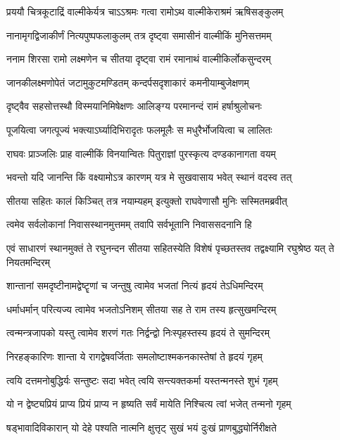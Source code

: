 \twolineshloka
{प्रययौ चित्रकूटाद्रिं वाल्मीकेर्यत्र चाऽऽश्रमः}
{गत्वा रामोऽथ वाल्मीकेराश्रमं ऋषिसङ्कुलम्} %

\twolineshloka
{नानामृगद्विजाकीर्णं नित्यपुष्पफलाकुलम्}
{तत्र दृष्ट्वा समासीनं वाल्मीकिं मुनिसत्तमम्} %

\twolineshloka
{ननाम शिरसा रामो लक्ष्मणेन च सीतया}
{दृष्ट्वा रामं रमानाथं वाल्मीकिर्लोकसुन्दरम्} %

\twolineshloka
{जानकीलक्ष्मणोपेतं जटामुकुटमण्डितम्}
{कन्दर्पसदृशाकारं कमनीयाम्बुजेक्षणम्} %

\twolineshloka
{दृष्ट्वैव सहसोत्तस्थौ विस्मयानिमिषेक्षणः}
{आलिङ्ग्य परमानन्दं रामं हर्षाश्रुलोचनः} %

\twolineshloka
{पूजयित्वा जगत्पूज्यं भक्त्याऽर्घ्यादिभिरादृतः}
{फलमूलैः स मधुरैर्भोजयित्वा च लालितः} %

\twolineshloka
{राघवः प्राञ्जलिः प्राह वाल्मीकिं विनयान्वितः}
{पितुराज्ञां पुरस्कृत्य दण्डकानागता वयम्} %

\twolineshloka
{भवन्तो यदि जानन्ति किं वक्ष्यामोऽत्र कारणम्}
{यत्र मे सुखवासाय भवेत् स्थानं वदस्व तत्} %

\twolineshloka
{सीतया सहितः कालं किञ्चित् तत्र नयाम्यहम्}
{इत्युक्तो राघवेणासौ मुनिः सस्मितमब्रवीत्} %

\twolineshloka
{त्वमेव सर्वलोकानां निवासस्थानमुत्तमम्}
{तवापि सर्वभूतानि निवाससदनानि हि} %

\threelineshloka
{एवं साधारणं स्थानमुक्तं ते रघुनन्दन}
{सीतया सहितस्येति विशेषं पृच्छतस्तव}
{तद्वक्ष्यामि रघुश्रेष्ठ यत् ते नियतमन्दिरम्} %

\twolineshloka
{शान्तानां समदृष्टीनामद्वेष्टॄणां च जन्तुषु}
{त्वामेव भजतां नित्यं हृदयं तेऽधिमन्दिरम्} %

\twolineshloka
{धर्माधर्मान् परित्यज्य त्वामेव भजतोऽनिशम्}
{सीतया सह ते राम तस्य हृत्सुखमन्दिरम्} %

\twolineshloka
{त्वन्मन्त्रजापको यस्तु त्वामेव शरणं गतः}
{निर्द्वन्द्वो निःस्पृहस्तस्य हृदयं ते सुमन्दिरम्} %

\twolineshloka
{निरहङ्कारिणः शान्ता ये रागद्वेषवर्जिताः}
{समलोष्टाश्मकनकास्तेषां ते हृदयं गृहम्} %

\twolineshloka
{त्वयि दत्तमनोबुद्धिर्यः सन्तुष्टः सदा भवेत्}
{त्वयि सन्त्यक्तकर्मा यस्तन्मनस्ते शुभं गृहम्} %

\twolineshloka
{यो न द्वेष्ट्यप्रियं प्राप्य प्रियं प्राप्य न हृष्यति}
{सर्वं मायेति निश्चित्य त्वां भजेत् तन्मनो गृहम्} %

\twolineshloka
{षड्भावादिविकारान् यो देहे पश्यति नात्मनि}
{क्षुत्तृट् सुखं भयं दुःखं प्राणबुद्ध्योर्निरीक्षते} %

